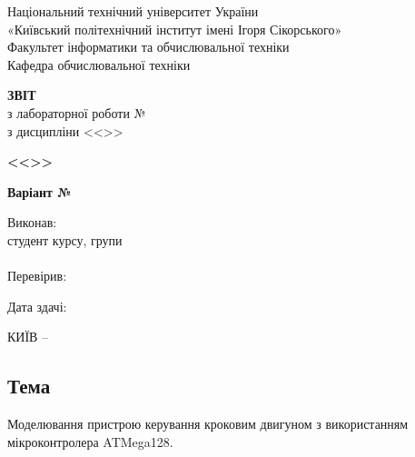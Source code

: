 \documentclass[14pt, a4paper]{extreport}
\begin{document}
	
	\begin{titlepage}
		\begin{center}
			\normalsize
			Національний технічний університет України\\
			«Київський політехнічний інститут імені Ігоря Сікорського» \\[0.5em]
			Факультет інформатики та обчислювальної техніки\\
			Кафедра обчислювальної техніки
			
			\vfill
			
			{\large \textbf{ЗВІТ}\\[0.5em]}
			{з лабораторної роботи №\LabNumber \\}
			{з дисципліни <<\CourseTitle>>}
			
			\vspace{2em}
			
			{\textbf{<<\Topic>>}}
			
			\vspace{1em}
			
			{\textbf{Варіант №\Variant}}
			
			\vfill
			
			\begin{flushright}
				Виконав: \\ студент \CourseNumber{} курсу, групи \StudentGroup \\
				\StudentName \\[1em]
				Перевірив: \\ \Teacher
			\end{flushright}
			
			\vfill
			
			\begin{flushright}
				Дата здачі: \DTMtoday
			\end{flushright}
			
			\vspace{5em}
			КИЇВ -- \ReportYear
		\end{center}
	\end{titlepage}
	
	\clearpage
	\setcounter{page}{2}
	
	\subsection*{Тема} 
	Моделювання пристрою керування кроковим двигуном з використанням мікроконтролера ATMega128.
	
\end{document}
